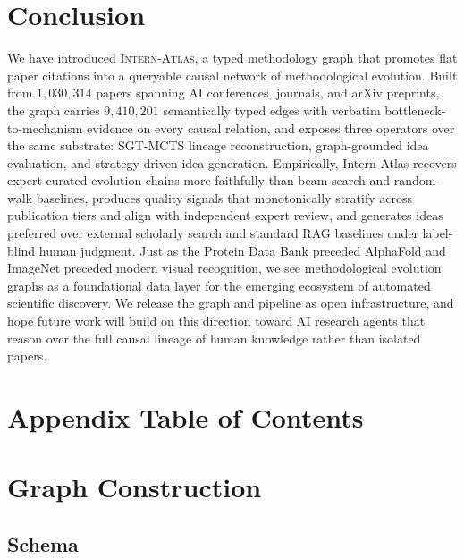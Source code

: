 \documentclass{opendatalab}
\begin{document}
\section{Conclusion}
We have introduced \textsc{Intern-Atlas}, a typed methodology graph that promotes flat paper citations into a queryable causal network of methodological evolution. Built from $1{,}030{,}314$ papers spanning AI conferences, journals, and arXiv preprints, the graph carries $9{,}410{,}201$ semantically typed edges with verbatim bottleneck-to-mechanism evidence on every causal relation, and exposes three operators over the same substrate: SGT-MCTS lineage reconstruction, graph-grounded idea evaluation, and strategy-driven idea generation. Empirically, Intern-Atlas recovers expert-curated evolution chains more faithfully than beam-search and random-walk baselines, produces quality signals that monotonically stratify across publication tiers and align with independent expert review, and generates ideas preferred over external scholarly search and standard RAG baselines under label-blind human judgment. Just as the Protein Data Bank preceded AlphaFold and ImageNet preceded modern visual recognition, we see methodological evolution graphs as a foundational data layer for the emerging ecosystem of automated scientific discovery. We release the graph and pipeline as open infrastructure, and hope future work will build on this direction toward AI research agents that reason over the full causal lineage of human knowledge rather than isolated papers.
\clearpage




\clearpage
\appendix

\section*{Appendix Table of Contents}
\begingroup
\hypersetup{linkcolor=black}
\startcontents[appendix]
\endgroup

\vspace{1em}
\clearpage
\section{Graph Construction}
\label{app:graph}

\subsection{Schema}
\end{document}
